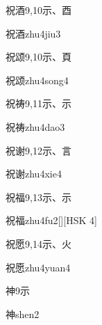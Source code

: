 \begin{entry}{祝酒}{9,10}{⽰、⾣}
  \begin{phonetics}{祝酒}{zhu4jiu3}
  \end{phonetics}
\end{entry}

\begin{entry}{祝颂}{9,10}{⽰、⾴}
  \begin{phonetics}{祝颂}{zhu4song4}
  \end{phonetics}
\end{entry}

\begin{entry}{祝祷}{9,11}{⽰、⽰}
  \begin{phonetics}{祝祷}{zhu4dao3}
  \end{phonetics}
\end{entry}

\begin{entry}{祝谢}{9,12}{⽰、⾔}
  \begin{phonetics}{祝谢}{zhu4xie4}
  \end{phonetics}
\end{entry}

\begin{entry}{祝福}{9,13}{⽰、⽰}
  \begin{phonetics}{祝福}{zhu4fu2}[][HSK 4]
  \end{phonetics}
\end{entry}

\begin{entry}{祝愿}{9,14}{⽰、⽕}
  \begin{phonetics}{祝愿}{zhu4yuan4}
  \end{phonetics}
\end{entry}

\begin{entry}{神}{9}{⽰}
  \begin{phonetics}{神}{shen2}
  \end{phonetics}
\end{entry}

